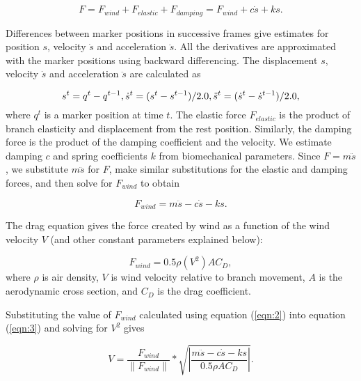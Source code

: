 \begin{equation}
\label{eqn:1}  
			F = F_{wind} + F_{elastic} + F_{damping} = F_{wind} + c\dot{s} + ks.
\end{equation} 

Differences between marker positions in successive frames give estimates for position $s$, velocity $\dot{s}$ and acceleration $\ddot{s}$. All the derivatives are approximated with the marker positions using backward differencing. The displacement $s$, velocity $\dot{s}$ and acceleration $\ddot{s}$ are calculated as

\begin{equation}
\label{eqn:diff}
s^t = q^t - q^{t-1},\\
\dot{s}^t =  (s^t - s^{t-1})/2.0,\\
\ddot{s}^t = (\dot{s}^t - \dot{s}^{t-1})/2.0,
\end{equation}
where $q^t$ is a marker position at time $t$. The elastic force $F_{elastic}$ is the product of branch elasticity and displacement from the rest position. Similarly, the damping force is the product of the damping coefficient and the velocity. We estimate damping $c$ and spring coefficients $k$ from biomechanical parameters. Since $F = m\ddot{s}$, we substitute $m\ddot{s}$ for $F$, make similar substitutions for the elastic and damping forces, and then solve for $F_{wind}$ to obtain 

\begin{equation}
\label{eqn:2}
			F_{wind} = m\ddot{s} - c\dot{s} - ks.      
\end{equation}

The drag equation gives the force created by wind as a function of the wind velocity $V$ (and other constant parameters explained below): 

\begin{equation}
\label{eqn:3}
			F_{wind} = 0.5\rho(V^2)AC_D,
\end{equation}
where $\rho$ is air density, $V$ is wind velocity relative to branch movement, $A$ is the aerodynamic cross section, and $C_D$ is the drag coefficient.

Substituting the value of $F_{wind}$ calculated using equation (\ref{eqn:2}) into equation (\ref{eqn:3}) and solving for $V^2$ gives

\begin{equation}
\label{eqn:4}
		V = \frac{F_{wind}}{\left\|F_{wind}\right\|} * \sqrt{\left|\frac{m\ddot{s} - c\dot{s} - ks}{0.5{\rho}AC_D}\right|}.
\end{equation}

